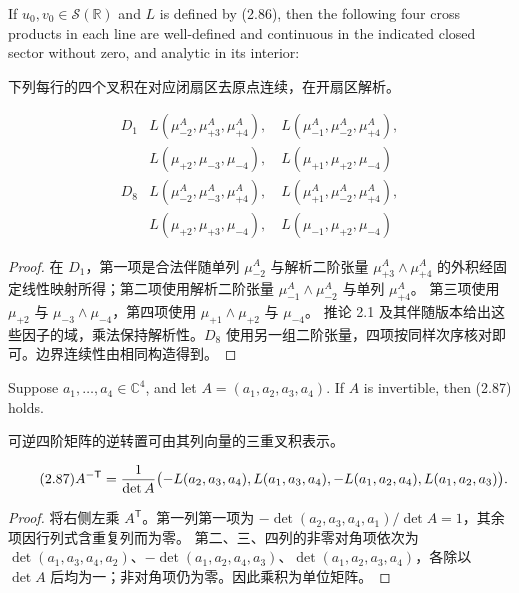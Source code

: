\begin{paperlemmaen}
If $u_0,v_0\in\mathcal S(\mathbb R)$ and $L$ is defined by (2.86), then the following four cross products in each line are well-defined and continuous in the indicated closed sector without zero, and analytic in its interior:
\end{paperlemmaen}
\begin{paperlemmacn*}
下列每行的四个叉积在对应闭扇区去原点连续，在开扇区解析。
\end{paperlemmacn*}
\[
\begin{array}{c|l}
D_1&L(\mu_{-2}^A,\mu_{+3}^A,\mu_{+4}^A),\quad L(\mu_{-1}^A,\mu_{-2}^A,\mu_{+4}^A),\\
&L(\mu_{+2},\mu_{-3},\mu_{-4}),\quad L(\mu_{+1},\mu_{+2},\mu_{-4})\\[2pt]
D_8&L(\mu_{-2}^A,\mu_{-3}^A,\mu_{+4}^A),\quad L(\mu_{+1}^A,\mu_{-2}^A,\mu_{+4}^A),\\
&L(\mu_{+2},\mu_{+3},\mu_{-4}),\quad L(\mu_{-1},\mu_{+2},\mu_{-4})
\end{array}
\]
\begin{proof}
在 $D_1$，第一项是合法伴随单列 $\mu_{-2}^A$ 与解析二阶张量 $\mu_{+3}^A\wedge\mu_{+4}^A$ 的外积经固定线性映射所得；第二项使用解析二阶张量 $\mu_{-1}^A\wedge\mu_{-2}^A$ 与单列 $\mu_{+4}^A$。
第三项使用 $\mu_{+2}$ 与 $\mu_{-3}\wedge\mu_{-4}$，第四项使用 $\mu_{+1}\wedge\mu_{+2}$ 与 $\mu_{-4}$。
推论 2.1 及其伴随版本给出这些因子的域，乘法保持解析性。$D_8$ 使用另一组二阶张量，四项按同样次序核对即可。边界连续性由相同构造得到。
\end{proof}
\begin{paperlemmaen}
Suppose $a_1,\ldots,a_4\in\mathbb C^4$, and let $A=(a_1,a_2,a_3,a_4)$. If $A$ is invertible, then (2.87) holds.
\end{paperlemmaen}
\begin{paperlemmacn*}
可逆四阶矩阵的逆转置可由其列向量的三重叉积表示。
\end{paperlemmacn*}
\begin{equation}\originaleq{2.87}
A^{-\mathsf T}=\dfrac{1}{\det A}\bigl(-L(a_2,a_3,a_4),L(a_1,a_3,a_4),-L(a_1,a_2,a_4),L(a_1,a_2,a_3)\bigr).
\end{equation}
\begin{proof}
将右侧左乘 $A^{\mathsf T}$。第一列第一项为 $-\det(a_2,a_3,a_4,a_1)/\det A=1$，其余项因行列式含重复列而为零。
第二、三、四列的非零对角项依次为 $\det(a_1,a_3,a_4,a_2)$、$-\det(a_1,a_2,a_4,a_3)$、$\det(a_1,a_2,a_3,a_4)$，各除以 $\det A$ 后均为一；非对角项仍为零。因此乘积为单位矩阵。
\end{proof}
